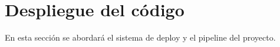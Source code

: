 
\section{Despliegue del código}\label{despliegue:despliegue-del-codigo}
En esta sección se abordará el sistema de deploy y el pipeline del proyecto.
